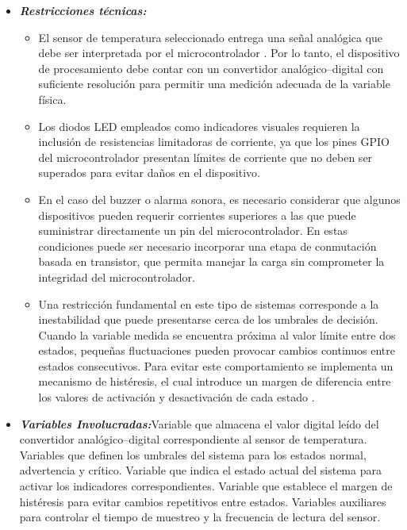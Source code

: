 \begin{itemize}
    En lo que corresponde a las salidas, el sistema contará con indicadores visuales y sonoros que permitirán identificar el estado operativo del sistema de monitoreo. Para ello se emplearán tres diodos LED que representarán los estados de operación normal, advertencia y condición crítica respectivamente. De manera adicional se incorporará una alarma sonora mediante un buzzer, el cual se activará únicamente cuando el sistema detecte que la variable monitoreada ha alcanzado el nivel crítico. 
\vspace{0,3cm}
    \item \textbf{\textit{Restricciones técnicas: }}
    \begin{itemize}
        \item El sensor de temperatura seleccionado entrega una señal analógica que debe ser interpretada por el microcontrolador \cite{LM35_datasheet}. Por lo tanto, el dispositivo de procesamiento debe contar con un convertidor analógico–digital con suficiente resolución para permitir una medición adecuada de la variable física.
        \item Los diodos LED empleados como indicadores visuales requieren la inclusión de resistencias limitadoras de corriente, ya que los pines GPIO del microcontrolador presentan límites de corriente que no deben ser superados para evitar daños en el dispositivo.
        \item En el caso del buzzer o alarma sonora, es necesario considerar que algunos dispositivos pueden requerir corrientes superiores a las que puede suministrar directamente un pin del microcontrolador\cite{buzzer_datasheet}. En estas condiciones puede ser necesario incorporar una etapa de conmutación basada en transistor, que permita manejar la carga sin comprometer la integridad del microcontrolador.
        \item Una restricción fundamental en este tipo de sistemas corresponde a la inestabilidad que puede presentarse cerca de los umbrales de decisión. Cuando la variable medida se encuentra próxima al valor límite entre dos estados, pequeñas fluctuaciones pueden provocar cambios continuos entre estados consecutivos. Para evitar este comportamiento se implementa un mecanismo de histéresis, el cual introduce un margen de diferencia entre los valores de activación y desactivación de cada estado \cite{temperature_hysteresis_cadence}.
    \end{itemize}
    \item 
    \textbf{\textit{Variables Involucradas:}}Variable que almacena el valor digital leído del convertidor analógico–digital correspondiente al sensor de temperatura. Variables que definen los umbrales del sistema para los estados normal, advertencia y crítico. Variable que indica el estado actual del sistema para activar los indicadores correspondientes. Variable que establece el margen de histéresis para evitar cambios repetitivos entre estados. Variables auxiliares para controlar el tiempo de muestreo y la frecuencia de lectura del sensor.
\end{itemize}

